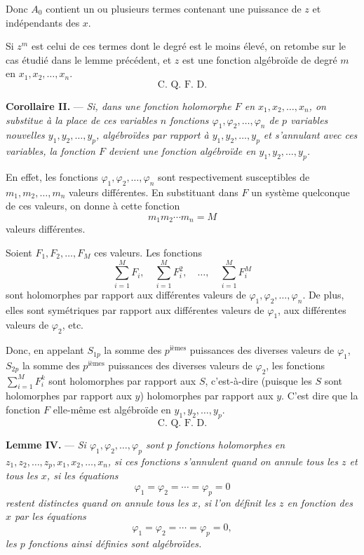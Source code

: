 \documentclass[11pt]{article}
\begin{document}
Donc $A_0$ contient un ou plusieurs termes contenant une puissance de $z$ et indépendants des $x$.

Si $z^m$ est celui de ces termes dont le degré est le moins élevé, on retombe sur le cas étudié dans le lemme précédent, et $z$ est une fonction algébroïde de degré $m$ en $x_1,x_2,\ldots,x_n$.
\[
\text{C. Q. F. D.}
\]

\medskip
\noindent\textbf{Corollaire II.} — \emph{Si, dans une fonction holomorphe $F$ en $x_1,x_2,\ldots,x_n$, on substitue à la place de ces variables $n$ fonctions $\varphi_1,\varphi_2,\ldots,\varphi_n$ de $p$ variables nouvelles $y_1,y_2,\ldots,y_p$, algébroïdes par rapport à $y_1,y_2,\ldots,y_p$ et s'annulant avec ces variables, la fonction $F$ devient une fonction algébroïde en $y_1,y_2,\ldots,y_p$.}

En effet, les fonctions $\varphi_1,\varphi_2,\ldots,\varphi_n$ sont respectivement susceptibles de $m_1,m_2,\ldots,m_n$ valeurs différentes. En substituant dans $F$ un système quelconque de ces valeurs, on donne à cette fonction
\[
m_1m_2\cdots m_n=M
\]
valeurs différentes.

Soient $F_1,F_2,\ldots,F_M$ ces valeurs. Les fonctions
\[
\sum_{i=1}^{M}F_i,
\quad \sum_{i=1}^{M}F_i^2,
\quad \ldots,
\quad \sum_{i=1}^{M}F_i^M
\]
sont holomorphes par rapport aux différentes valeurs de $\varphi_1,\varphi_2,\ldots,\varphi_n$. De plus, elles sont symétriques par rapport aux différentes valeurs de $\varphi_1$, aux différentes valeurs de $\varphi_2$, etc.

Donc, en appelant $S_{1p}$ la somme des $p^\text{ièmes}$ puissances des diverses valeurs de $\varphi_1$, $S_{2p}$ la somme des $p^\text{ièmes}$ puissances des diverses valeurs de $\varphi_2$, les fonctions $\sum_{i=1}^{M}F_i^k$ sont holomorphes par rapport aux $S$, c'est-à-dire (puisque les $S$ sont holomorphes par rapport aux $y$) holomorphes par rapport aux $y$. C'est dire que la fonction $F$ elle-même est algébroïde en $y_1,y_2,\ldots,y_p$.
\[
\text{C. Q. F. D.}
\]

\medskip
\noindent\textbf{Lemme IV.} — \emph{Si $\varphi_1,\varphi_2,\ldots,\varphi_p$ sont $p$ fonctions holomorphes en $z_1,z_2,\ldots,z_p,x_1,x_2,\ldots,x_n$, si ces fonctions s'annulent quand on annule tous les $z$ et tous les $x$, si les équations}
\[
\varphi_1=\varphi_2=\cdots=\varphi_p=0
\]
\emph{restent distinctes quand on annule tous les $x$, si l'on définit les $z$ en fonction des $x$ par les équations}
\[
\varphi_1=\varphi_2=\cdots=\varphi_p=0,
\]
\emph{les $p$ fonctions ainsi définies sont algébroïdes.}
\end{document}
